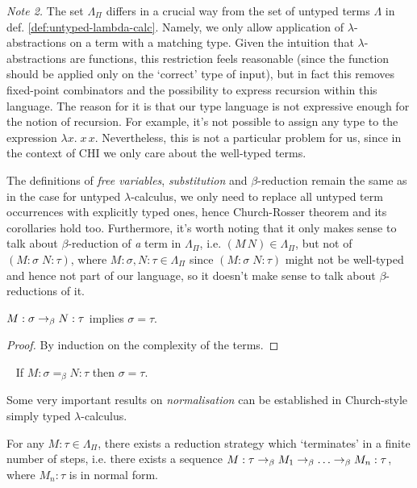\emph{Note 2.}
    The set $\Lambda_\Pi$ differs in a crucial way from the set of
    untyped terms $\Lambda$ in def.  \ref{def:untyped-lambda-calc}.
    Namely, we only allow application of $\lambda$-abstractions on a
    term with a matching type.  Given the intuition that
    $\lambda$-abstractions are functions, this restriction feels
    reasonable (since the function should be applied only on the
    `correct' type of input), but in fact this removes fixed-point
    combinators and the possibility to express recursion within this
    language. The reason for it is that our type language is not
    expressive enough for the notion of recursion. For example, it's
    not possible to assign any type to the expression $\lambda x.\; x\,
    x$. Nevertheless, this is not a particular problem for us, since in
    the context of CHI we only care about the well-typed terms.

The definitions of \emph{free variables}, \emph{substitution} and
$\beta$-reduction remain the same as in the case for untyped
$\lambda$-calculus, we only need to replace all untyped term occurrences with
explicitly typed ones, hence Church-Rosser theorem and its corollaries hold
too. Furthermore, it's worth noting that it only makes sense to talk about
$\beta$-reduction of \emph{a} term in $\Lambda_\Pi$, i.e. $(M\, N) \in
\Lambda_\Pi$, but not of $(M\!:\!\sigma\; N\!:\!\tau)$, where $M:\sigma, N:\tau
\in \Lambda_\Pi$ since $(M\!:\!\sigma\; N\!:\!\tau)$ might not be well-typed
and hence not part of our language, so it doesn't make sense to talk about
$\beta$-reductions of it.

\begin{proposition}
    $M:\sigma \rightarrow_\beta N:\tau$ implies $\sigma = \tau$.
\end{proposition}
\begin{proof}
    By induction on the complexity of the terms.
\end{proof}

\begin{corollary} {\ }
\label{cor:uniquenessoftypes}
    If $M:\sigma =_\beta N:\tau$ then $\sigma = \tau$.
\end{corollary}

Some very important results on \emph{normalisation} can be established in
Church-style simply typed $\lambda$-calculus.
\begin{theorem}\label{thm:weaknorm}
    For any $M:\tau \in \Lambda_\Pi$, there exists a reduction strategy which
    `terminates' in a finite number of steps, i.e. there exists a sequence
    $M:\tau \rightarrow_\beta M_1 \rightarrow_\beta \ldots \rightarrow_\beta M_n:\tau$, where $M_n:\tau$
    is in normal form.
\end{theorem}

